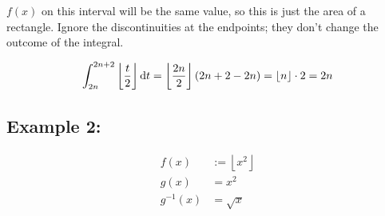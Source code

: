 \documentclass[12pt]{article}
\begin{document}
		$f(x)$ on this interval will be the same value, so this is just the area of a rectangle.
		Ignore the discontinuities at the endpoints; they don't change the outcome of the integral.

		\begin{align*}
			\int_{2n}^{2n+2}\left\lfloor\frac t2\right\rfloor\text dt
			= \left\lfloor\frac{2n}2\right\rfloor(2n+2-2n)
			= \lfloor n\rfloor\cdot2 = 2n
		\end{align*}

	\subsection*{Example 2:}

		\begin{minipage}{0.5\textwidth}
			\begin{align*}
				f(x) & := \left\lfloor x^2\right\rfloor\\
				g(x) & = x^2\\
				g^{-1}(x) & = \sqrt x\\
			\end{align*}
		\end{minipage}
		\hfill
\end{document}
